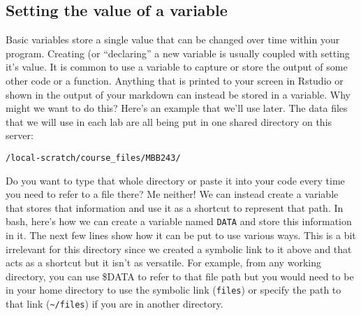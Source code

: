 \documentclass[
]{article}
\newenvironment{Shaded}{\begin{snugshade}}{\end{snugshade}}
\newcommand{\AlertTok}[1]{\textcolor[rgb]{0.94,0.16,0.16}{#1}}
\newcommand{\AttributeTok}[1]{\textcolor[rgb]{0.77,0.63,0.00}{#1}}
\newcommand{\BuiltInTok}[1]{#1}
\newcommand{\CommentTok}[1]{\textcolor[rgb]{0.56,0.35,0.01}{\textit{#1}}}
\newcommand{\FunctionTok}[1]{\textcolor[rgb]{0.00,0.00,0.00}{#1}}
\newcommand{\NormalTok}[1]{#1}
\newcommand{\OperatorTok}[1]{\textcolor[rgb]{0.81,0.36,0.00}{\textbf{#1}}}
\newcommand{\StringTok}[1]{\textcolor[rgb]{0.31,0.60,0.02}{#1}}
\newcommand{\VariableTok}[1]{\textcolor[rgb]{0.00,0.00,0.00}{#1}}
\begin{document}
\hypertarget{setting-the-value-of-a-variable}{%
\subsection{Setting the value of a
variable}\label{setting-the-value-of-a-variable}}

Basic variables store a single value that can be changed over time
within your program. Creating (or ``declaring'' a new variable is
usually coupled with setting it's value. It is common to use a variable
to capture or store the output of some other code or a function.
Anything that is printed to your screen in Rstudio or shown in the
output of your markdown can instead be stored in a variable. Why might
we want to do this? Here's an example that we'll use later. The data
files that we will use in each lab are all being put in one shared
directory on this server:

\texttt{/local-scratch/course\_files/MBB243/}

Do you want to type that whole directory or paste it into your code
every time you need to refer to a file there? Me neither! We can instead
create a variable that stores that information and use it as a shortcut
to represent that path. In bash, here's how we can create a variable
named \texttt{DATA} and store this information in it. The next few lines
show how it can be put to use various ways. This is a bit irrelevant for
this directory since we created a symbolic link to it above and that
acts as a shortcut but it isn't as versatile. For example, from any
working directory, you can use \$DATA to refer to that file path but you
would need to be in your home directory to use the symbolic link
(\texttt{files}) or specify the path to that link
(\texttt{\textasciitilde{}/files}) if you are in another directory.

\begin{Shaded}
\end{Shaded}
\end{document}
